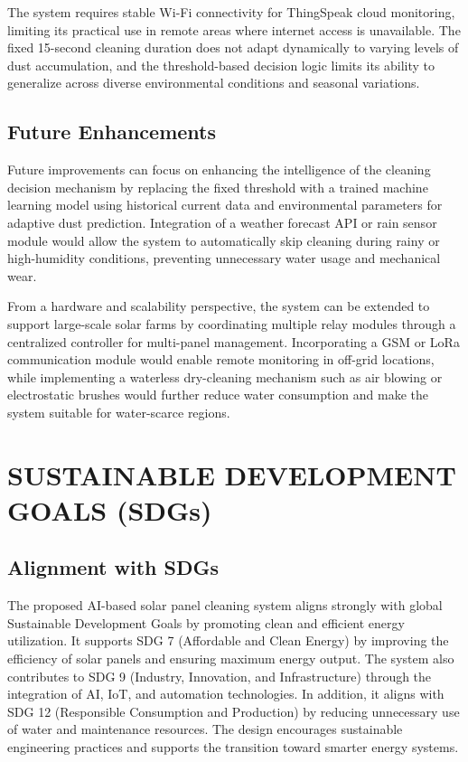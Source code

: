 \documentclass[10pt]{report}
\begin{document}
\begin{sloppypar}
{{{\begin{sloppypar}
The system requires stable Wi-Fi connectivity for ThingSpeak cloud monitoring, limiting its practical use in remote areas where internet access is unavailable. The fixed 15-second cleaning duration does not adapt dynamically to varying levels of dust accumulation, and the threshold-based decision logic limits its ability to generalize across diverse environmental conditions and seasonal variations.

\section{Future Enhancements}
\hspace{0.5cm}Future improvements can focus on enhancing the intelligence of the cleaning decision mechanism by replacing the fixed threshold with a trained machine learning model using historical current data and environmental parameters for adaptive dust prediction. Integration of a weather forecast API or rain sensor module would allow the system to automatically skip cleaning during rainy or high-humidity conditions, preventing unnecessary water usage and mechanical wear.

From a hardware and scalability perspective, the system can be extended to support large-scale solar farms by coordinating multiple relay modules through a centralized controller for multi-panel management. Incorporating a GSM or LoRa communication module would enable remote monitoring in off-grid locations, while implementing a waterless dry-cleaning mechanism such as air blowing or electrostatic brushes would further reduce water consumption and make the system suitable for water-scarce regions.


\chapter{SUSTAINABLE DEVELOPMENT GOALS
(SDGs)
}

\section{Alignment with SDGs}
\hspace{0.5cm}

The proposed AI-based solar panel cleaning system aligns strongly with global
Sustainable Development Goals by promoting clean and efficient energy utilization.
It supports SDG 7 (Affordable and Clean Energy) by improving the efficiency of
solar panels and ensuring maximum energy output. The system also contributes to
SDG 9 (Industry, Innovation, and Infrastructure) through the integration of AI, IoT,
and automation technologies. In addition, it aligns with SDG 12 (Responsible Consumption and Production) by reducing unnecessary use of water and maintenance
resources. The design encourages sustainable engineering practices and supports the
transition toward smarter energy systems. 


\end{sloppypar}}}}
\end{sloppypar}
\end{document}

